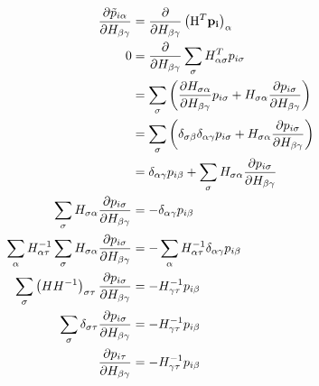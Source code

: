 \documentclass[11pt,a4paper,uplatex]{jsarticle}
\begin{document}
\begin{align}
    \frac{\partial \tilde{ p}_{i \alpha} }{\partial H_{\beta \gamma}} 
    &= \frac{\partial }{\partial H_{\beta \gamma}} \left({\rm H}^{T} \bf{p}_{i}\right)_{\alpha} \\
    0 &= \frac{\partial }{\partial H_{\beta \gamma}} \sum_{\sigma} H^{T}_{\alpha \sigma} p_{i \sigma}\\
    &= \sum_{\sigma} \left( \frac{\partial H_{\sigma \alpha} }{\partial H_{\beta \gamma}} p_{i \sigma}  +  H_{\sigma \alpha} \frac{\partial  p_{i \sigma}}{\partial H_{\beta \gamma}} \right) \\
    &= \sum_{\sigma} \left( \delta_{\sigma \beta} \delta_{\alpha \gamma} p_{i \sigma}  +  H_{\sigma \alpha} \frac{\partial  p_{i \sigma}}{\partial H_{\beta \gamma}} \right) \\
    &= \delta_{\alpha \gamma} p_{i \beta} + \sum_{\sigma} H_{\sigma \alpha} \frac{\partial  p_{i \sigma}}{\partial H_{\beta \gamma}}\\
    \sum_{\sigma} H_{\sigma \alpha} \frac{\partial  p_{i \sigma}}{\partial H_{\beta \gamma}} &= - \delta_{\alpha \gamma} p_{i \beta} 
    \\
    \sum_{\alpha} H^{-1}_{\alpha \tau} \sum_{\sigma} H_{\sigma \alpha} \frac{\partial  p_{i \sigma}}{\partial H_{\beta \gamma}} &= - \sum_{\alpha} H^{-1}_{\alpha \tau}  \delta_{\alpha \gamma} p_{i \beta}  
    \\
    \sum_{\sigma} \left( H H^{-1} \right)_{\sigma \tau}  \frac{\partial  p_{i \sigma}}{\partial H_{\beta \gamma}} &= - H^{-1}_{\gamma \tau} p_{i \beta}  \\%
    \sum_{\sigma} \delta_{\sigma \tau}  \frac{\partial  p_{i \sigma}}{\partial H_{\beta \gamma}} &= - H^{-1}_{\gamma \tau} p_{i \beta}  \\%
    \frac{\partial  p_{i \tau}}{\partial H_{\beta \gamma}} &= - H^{-1}_{\gamma \tau} p_{i \beta}  %
\end{align}
\end{document}
